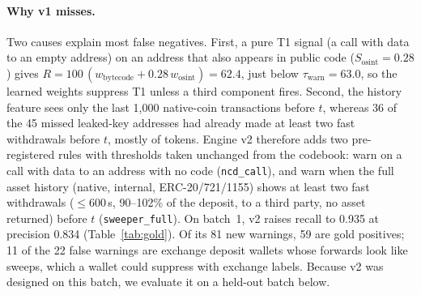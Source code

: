 \documentclass[runningheads]{llncs}
\begin{document}
\paragraph{Why v1 misses.} Two causes explain most false negatives. First, a pure
T1 signal (a call with data to an empty address) on an address that also
appears in public code ($S_{\mathrm{osint}}=0.28$) gives $R=100\,(w_{\mathrm{bytecode}}+0.28\,w_{\mathrm{osint}})=62.4$,
just below $\tau_{\mathrm{warn}}=63.0$, so the learned weights suppress T1
unless a third component fires. Second, the
history feature sees only the last 1{,}000 native-coin transactions before $t$,
whereas 36 of the 45 missed leaked-key addresses had already made at least two
fast withdrawals before $t$, mostly of tokens. Engine v2 therefore adds two
pre-registered rules with thresholds taken unchanged from the codebook: warn
on a call with data to an address with no code (\texttt{ncd\_call}), and warn when the
full asset history (native, internal, ERC-20/721/1155) shows at least two fast
withdrawals ($\le600$\,s, 90--102\% of the deposit, to a third party, no asset
returned) before $t$ (\texttt{sweeper\_full}). On batch~1, v2 raises recall to
0.935 at precision 0.834 (Table~\ref{tab:gold}). Of its 81 new warnings, 59 are
gold positives; 11 of the 22 false warnings are exchange deposit wallets whose
forwards look like sweeps, which a wallet could suppress with exchange labels.
Because v2 was designed on this batch, we evaluate it on a held-out batch below.
\end{document}
